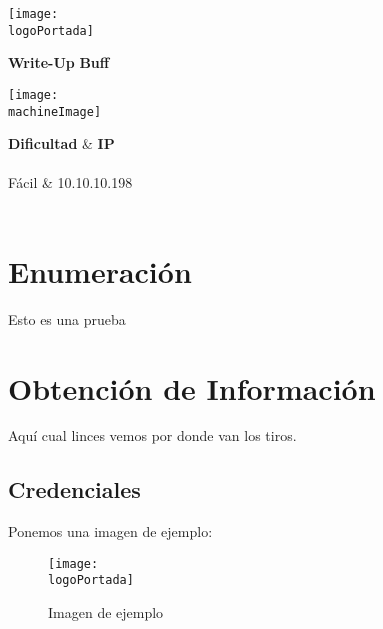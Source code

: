 \documentclass[a4paper]{article} %
\newcommand{\machineName}{Buff}					%
\newcommand{\logoPortada}{Images/portada.png}	%
\newcommand{\machineImage}{Images/maquina.png}	%
\begin{document}
	\cfoot{\thepage}
	
	\begin{titlepage}
		
		\centering
		\texttt{[image: \\logoPortada]} \\
		\vfill
		
		{\Huge\bfseries{Write-Up}} \vskip 0.2cm
		{\Huge\bfseries\textcolor{verdeHTB}{\machineName}} \\
		\vfill
		
		\texttt{[image: \\machineImage]} \vskip 1cm
		

	
		\vfill
		\begin{tcolorbox}[tab1,tabularx={Y||Y}]	
			{\Huge\bfseries{Dificultad}} & {\Huge\bfseries{IP}} \\ \\
			{\Large{Fácil}}  & {\Large{10.10.10.198}} \\
			\\
		\end{tcolorbox}

		
	\end{titlepage}
	
	
	
	
	\clearpage
	\tableofcontents	
	\clearpage
	
	
	\section{Enumeración}
	Esto es una prueba
	
	\section{Obtención de Información}
	Aquí cual linces vemos por donde van los tiros. 
	
	\subsection{Credenciales}
	Ponemos una imagen de ejemplo:
	
	\begin{figure}[h]
		\centering
		\texttt{[image: \\logoPortada]}
		\caption{Imagen de ejemplo}
	\end{figure}
	
\end{document}
